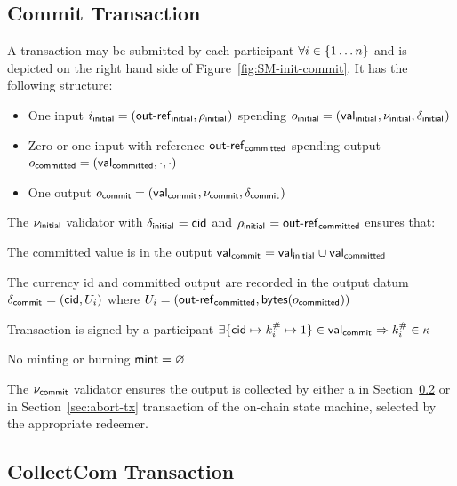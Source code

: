 \subsection{Commit Transaction}\label{sec:commit-tx}

A \mtxCom{} transaction may be submitted by each participant
$\forall i \in \{1 \dots n\}$ and is depicted on the right hand side of
Figure~\ref{fig:SM-init-commit}. It has the following structure:
\begin{itemize}
  \item One input $i_{\mathsf{initial}} = (\mathsf{out\textsf{-}{}ref}_{\mathsf{initial}}, \rho_{\mathsf{initial}_{}})$
        spending $o_{\mathsf{initial}} = (\mathsf{val}_{\mathsf{initial}_{}}, \nu_{\mathsf{initial}}, \delta_{\mathsf{initial}_{}})$
  \item Zero or one input with reference
        $\mathsf{out\textsf{-}{}ref}_{\mathsf{committed}}$ spending output
        $o_{\mathsf{committed}} = (\mathsf{val}_{\mathsf{committed}}, \cdot , \cdot)$
  \item One output $o_{\mathsf{commit}} = (\mathsf{val}_{\mathsf{commit}_{}}, \nu_{\mathsf{commit}}, \delta_{\mathsf{commit}_{}})$
\end{itemize}

\noindent The $\nu_{\mathsf{initial}}$ validator with $\delta_{\mathsf{initial}_{}} = \mathsf{cid}$ and $\rho_{\mathsf{initial}_{}} = \mathsf{out\textsf{-}{}ref}_{\mathsf{committed}}$ ensures that:
\begin{menumerate}
  \item The committed value is in the output $\mathsf{val}_{\mathsf{commit}_{}} = \mathsf{val}_{\mathsf{initial}_{}} \cup \mathsf{val}_{\mathsf{committed}}$
  \item The currency id and committed output are recorded in the output datum
  $\delta_{\mathsf{commit}_{}} = (\mathsf{cid}, U_{i})$ where
  $U_{i} = (\mathsf{out\textsf{-}{}ref}_{\mathsf{committed}},\mathsf{bytes}(o_{\mathsf{committed}}))$
  \item Transaction is signed by a participant $\exists \{\mathsf{cid} \mapsto k^{\#}_{i} \mapsto 1\} \in \mathsf{val}_{\mathsf{commit}_{}} \Rightarrow k^{\#}_{i} \in \kappa$
  \item No minting or burning  $\mathsf{mint} = \varnothing$
\end{menumerate}

\noindent The $\nu_{\mathsf{commit}}$ validator ensures the output is collected by either a \mtxCCom{} in Section~\ref{sec:collect-tx} or \mtxAbort{} in Section~\ref{sec:abort-tx} transaction of the on-chain state machine, selected by the appropriate redeemer.

\subsection{CollectCom Transaction}\label{sec:collect-tx}

